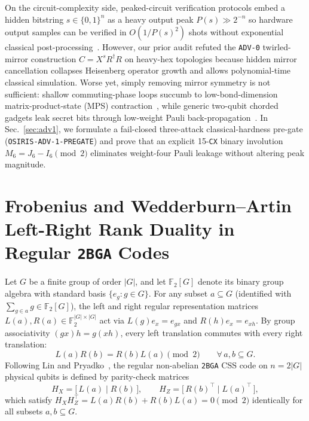 \documentclass[aps,prapplied,reprint,longbibliography]{revtex4-2}
\begin{document}
On the circuit-complexity side, peaked-circuit verification protocols embed a hidden bitstring $s \in \{0,1\}^n$ as a heavy output peak $P(s) \gg 2^{-n}$ so hardware output samples can be verified in $O(1/P(s)^2)$ shots without exponential classical post-processing~\cite{aaronson2025verifiable}. However, our prior audit refuted the \texttt{ADV-0} twirled-mirror construction $C = X^s R^\dagger R$ on heavy-hex topologies because hidden mirror cancellation collapses Heisenberg operator growth and allows polynomial-time classical simulation. Worse yet, simply removing mirror symmetry is not sufficient: shallow commuting-phase loops succumb to low-bond-dimension matrix-product-state (MPS) contraction~\cite{vidal2003efficient}, while generic two-qubit chorded gadgets leak secret bits through low-weight Pauli back-propagation~\cite{begusic2024fast,fontana2025classical}. In Sec.~\ref{sec:adv1}, we formulate a fail-closed three-attack classical-hardness pre-gate (\texttt{OSIRIS-ADV-1-PREGATE}) and prove that an explicit 15-\texttt{CX} binary involution $M_6 = J_6 - I_6 \pmod 2$ eliminates weight-four Pauli leakage without altering peak magnitude.

\section{Frobenius and Wedderburn--Artin Left-Right Rank Duality in Regular \texttt{2BGA} Codes}
\label{sec:duality}

Let $G$ be a finite group of order $|G|$, and let $\mathbb{F}_2[G]$ denote its binary group algebra with standard basis $\{e_g : g \in G\}$. For any subset $a \subseteq G$ (identified with $\sum_{g \in a} g \in \mathbb{F}_2[G]$), the left and right regular representation matrices $L(a), R(a) \in \mathbb{F}_2^{|G|\times|G|}$ act via $L(g)e_x = e_{gx}$ and $R(h)e_x = e_{xh}$. By group associativity $(gx)h = g(xh)$, every left translation commutes with every right translation:
\begin{equation}
L(a) R(b) = R(b) L(a) \pmod{2} \qquad \forall\, a, b \subseteq G.
\label{eq:lr_commute}
\end{equation}
Following Lin and Pryadko~\cite{lin2024quantum}, the regular non-abelian \texttt{2BGA} CSS code on $n = 2|G|$ physical qubits is defined by parity-check matrices
\begin{equation}
H_X = \bigl[\,L(a) \;\big|\; R(b)\,\bigr], \qquad H_Z = \bigl[\,R(b)^\top \;\big|\; L(a)^\top\,\bigr],
\label{eq:regular_2bga}
\end{equation}
which satisfy $H_X H_Z^\top = L(a)R(b) + R(b)L(a) = 0 \pmod 2$ identically for all subsets $a, b \subseteq G$.
\end{document}
